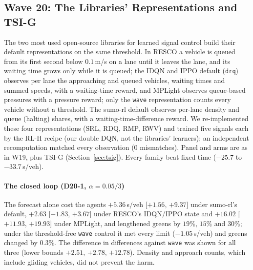 \subsection{Wave 20: The Libraries' Representations and TSI-G}\label{sec:w20}
The two most used open-source libraries for learned signal control build their default representations on the same threshold. In RESCO
\cite{ault2021} a vehicle is queued from its first second below $0.1$\,m/s on a lane until it leaves the lane, and its waiting time grows
only while it is queued; the IDQN and IPPO default (\texttt{drq}) observes per lane the approaching and queued vehicles, waiting times and
summed speeds, with a waiting-time reward, and MPLight observes queue-based pressures with a pressure reward; only the \texttt{wave}
representation counts every vehicle without a threshold. The sumo-rl default \cite{alegre2019} observes per-lane density and queue
(halting) shares, with a waiting-time-difference reward. We re-implemented these four representations (SRL, RDQ, RMP, RWV) and trained
five signals each by the RL-H recipe (our double DQN, not the libraries' learners); an independent recomputation matched every observation
(0 mismatches). Panel and arms are as in W19, plus TSI-G (Section~\ref{sec:tsig}). Every family beat fixed time ($-25.7$ to $-33.7$\,s/veh).
\paragraph{The closed loop (D20-1, $\alpha=0.05/3$)} The forecast alone cost the agents $+5.36$\,s/veh [$+1.56$, $+9.37$] under sumo-rl's
default, $+2.63$ [$+1.83$, $+3.67$] under RESCO's IDQN/IPPO state and $+16.02$ [$+11.93$, $+19.93$] under MPLight, and lengthened greens by
$19\%$, $15\%$ and $30\%$; under the threshold-free \texttt{wave} control it met every limit ($-1.05$\,s/veh) and greens changed by
$0.3\%$. The difference in differences against \texttt{wave} was shown for all three (lower bounds $+2.51$, $+2.78$, $+12.78$). Density and
approach counts, which include gliding vehicles, did not prevent the harm.
